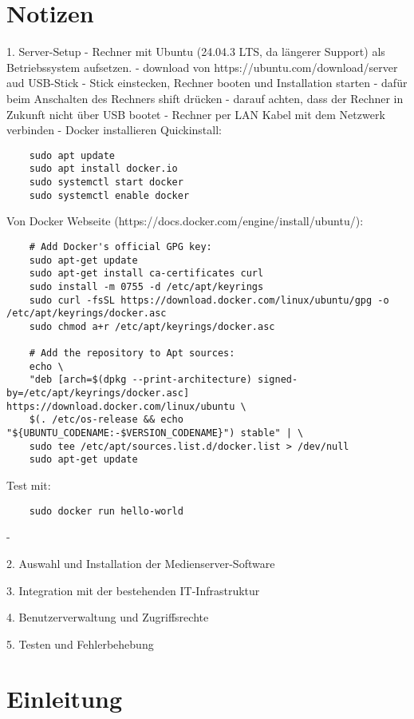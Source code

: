 \documentclass[12pt,a4paper]{article}
\begin{document}
\section{Notizen}
1. Server-Setup
- Rechner mit Ubuntu (24.04.3 LTS, da längerer Support) als Betriebssystem aufsetzen.
    - download von https://ubuntu.com/download/server aud USB-Stick
    - Stick einstecken, Rechner booten und Installation starten
        - dafür beim Anschalten des Rechners shift drücken
        - darauf achten, dass der Rechner in Zukunft nicht über USB bootet
        - Rechner per LAN Kabel mit dem Netzwerk verbinden
- Docker installieren
    Quickinstall:
    \begin{verbatim}
    sudo apt update
    sudo apt install docker.io
    sudo systemctl start docker
    sudo systemctl enable docker
    \end{verbatim}
    Von Docker Webseite (https://docs.docker.com/engine/install/ubuntu/):
    \begin{verbatim}
    # Add Docker's official GPG key:
    sudo apt-get update
    sudo apt-get install ca-certificates curl
    sudo install -m 0755 -d /etc/apt/keyrings
    sudo curl -fsSL https://download.docker.com/linux/ubuntu/gpg -o /etc/apt/keyrings/docker.asc
    sudo chmod a+r /etc/apt/keyrings/docker.asc

    # Add the repository to Apt sources:
    echo \
    "deb [arch=$(dpkg --print-architecture) signed-by=/etc/apt/keyrings/docker.asc] https://download.docker.com/linux/ubuntu \
    $(. /etc/os-release && echo "${UBUNTU_CODENAME:-$VERSION_CODENAME}") stable" | \
    sudo tee /etc/apt/sources.list.d/docker.list > /dev/null
    sudo apt-get update
    \end{verbatim}
    
    Test mit:
    \begin{verbatim} 
    sudo docker run hello-world 
    \end{verbatim}
- 


2. Auswahl und Installation der Medienserver-Software

3. Integration mit der bestehenden IT-Infrastruktur

4. Benutzerverwaltung und Zugriffsrechte

5. Testen und Fehlerbehebung

\section{Einleitung}
\end{document}
